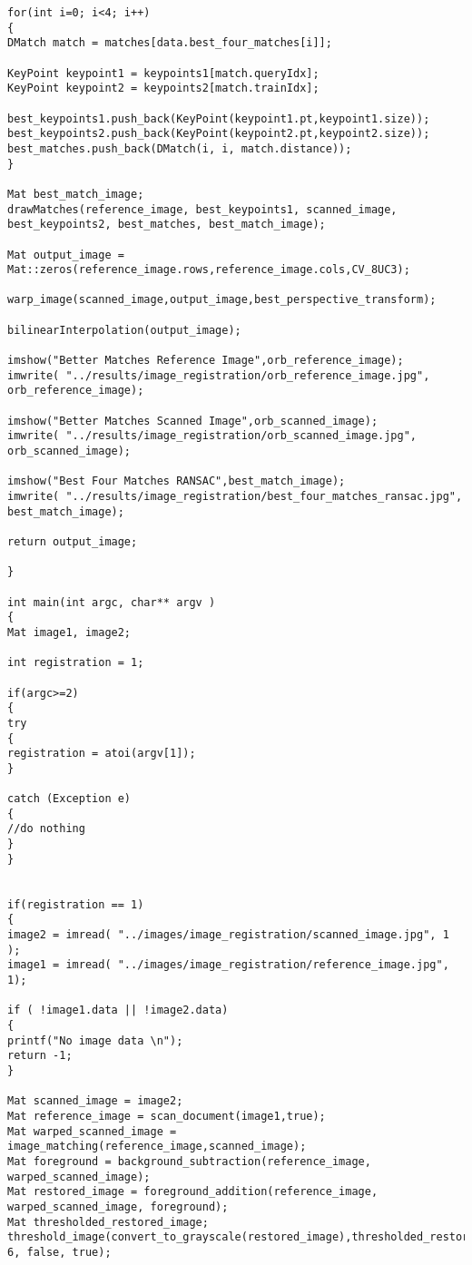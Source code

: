 \begin{lstlisting}
for(int i=0; i<4; i++)
{
DMatch match = matches[data.best_four_matches[i]];

KeyPoint keypoint1 = keypoints1[match.queryIdx];
KeyPoint keypoint2 = keypoints2[match.trainIdx];

best_keypoints1.push_back(KeyPoint(keypoint1.pt,keypoint1.size));
best_keypoints2.push_back(KeyPoint(keypoint2.pt,keypoint2.size));
best_matches.push_back(DMatch(i, i, match.distance));
}

Mat best_match_image;
drawMatches(reference_image, best_keypoints1, scanned_image, best_keypoints2, best_matches, best_match_image);

Mat output_image = Mat::zeros(reference_image.rows,reference_image.cols,CV_8UC3);

warp_image(scanned_image,output_image,best_perspective_transform);

bilinearInterpolation(output_image);

imshow("Better Matches Reference Image",orb_reference_image);
imwrite( "../results/image_registration/orb_reference_image.jpg", orb_reference_image);

imshow("Better Matches Scanned Image",orb_scanned_image);
imwrite( "../results/image_registration/orb_scanned_image.jpg", orb_scanned_image);

imshow("Best Four Matches RANSAC",best_match_image);
imwrite( "../results/image_registration/best_four_matches_ransac.jpg", best_match_image);

return output_image;

}

int main(int argc, char** argv )
{
Mat image1, image2;

int registration = 1;

if(argc>=2)
{
try
{
registration = atoi(argv[1]);
}

catch (Exception e)
{
//do nothing
}
}


if(registration == 1)
{
image2 = imread( "../images/image_registration/scanned_image.jpg", 1 );
image1 = imread( "../images/image_registration/reference_image.jpg", 1);

if ( !image1.data || !image2.data)
{
printf("No image data \n");
return -1;
}

Mat scanned_image = image2;
Mat reference_image = scan_document(image1,true);
Mat warped_scanned_image = image_matching(reference_image,scanned_image);
Mat foreground = background_subtraction(reference_image, warped_scanned_image);
Mat restored_image = foreground_addition(reference_image, warped_scanned_image, foreground);
Mat thresholded_restored_image;
threshold_image(convert_to_grayscale(restored_image),thresholded_restored_image, 6, false, true);


\end{lstlisting}
